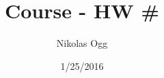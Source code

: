 \documentclass{article}
\title{Course - HW \#}
\date{1/25/2016}
\author{Nikolas Ogg}
\begin{document}

\section{}
\end{document}
